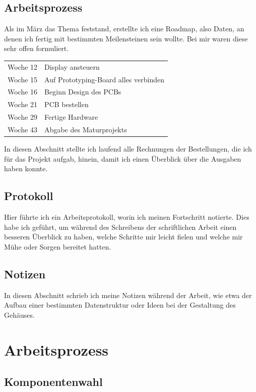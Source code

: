 \documentclass[12pt, a4paper]{report}
\begin{document}
\subsection{Arbeitsprozess}
Als im März das Thema feststand, erstellte ich eine Roadmap, also Daten, an denen ich fertig mit bestimmten Meilensteinen sein wollte. Bei mir waren diese sehr offen formuliert.
\begin{table}[H]
\begin{tabular}{|l|l|}
    \hline
    Woche 12 & Display ansteuern \\
    Woche 15 & Auf Prototyping-Board alles verbinden \\
    Woche 16 & Beginn Design des PCBs \\
    Woche 21 & PCB bestellen \\
    Woche 29 & Fertige Hardware \\
    Woche 43 & Abgabe des Maturprojekts \\
    \hline
\end{tabular}
\end{table}
\noindent
In diesen Abschnitt stellte ich laufend alle Rechnungen der Bestellungen, die ich für das Projekt aufgab, hinein, damit ich einen Überblick über die Ausgaben haben konnte.
\subsection{Protokoll}
Hier führte ich ein Arbeitsprotokoll, worin ich meinen Fortschritt notierte. Dies habe ich geführt, um während des Schreibens der schriftlichen Arbeit einen besseren Überblick zu haben, welche Schritte mir leicht fielen und welche mir Mühe oder Sorgen bereitet hatten.
\subsection{Notizen}
In diesen Abschnitt schrieb ich meine Notizen während der Arbeit, wie etwa der Aufbau einer bestimmten Datenstruktur oder Ideen bei der Gestaltung des Gehäuses.
\section{Arbeitsprozess}
\subsection{Komponentenwahl}
\end{document}
